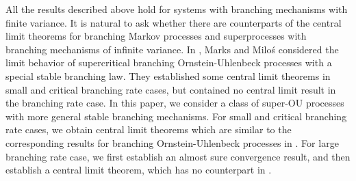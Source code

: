 \documentclass[12pt,a4paper]{amsart}
\theoremstyle{plain}
\theoremstyle{definition}
\numberwithin{equation}{section}
\begin{document}
 All the results described above hold for systems with branching mechanisms with finite variance. %
It is natural to ask whether there are 
counterparts of the central limit theorems for branching Markov processes and superprocesses %
with branching mechanisms of infinite variance.
 In \cite{MM}, Marks and Milo\'s considered the limit behavior of supercritical branching Ornstein-Uhlenbeck processes with a special stable branching law. They established some central limit theorems in small and critical branching rate cases,  
but \cite{MM} contained no central limit result in the branching rate case.
In this paper, we consider a class of super-OU processes with more general stable branching mechanisms. For small and critical branching rate cases, we obtain central limit theorems which are similar to the corresponding results for branching Ornstein-Uhlenbeck processes in \cite{MM}. For large branching rate case, we first establish  an almost sure convergence result, and then establish a central limit 
theorem, which has no counterpart in \cite{MM}.
\end{document}
